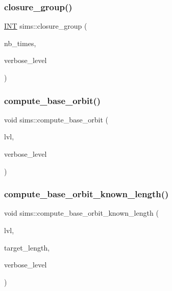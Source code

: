 \mbox{\label{classsims_a7ecab5d843b1960ba9386e1b5dd41b95}} 
\subsubsection{\texorpdfstring{closure\+\_\+group()}{closure\_group()}}
{\footnotesize\ttfamily \mbox{\hyperlink{galois_8h_a09fddde158a3a20bd2dcadb609de11dc}{I\+NT}} sims\+::closure\+\_\+group (\begin{DoxyParamCaption}\item[{\mbox{\hyperlink{galois_8h_a09fddde158a3a20bd2dcadb609de11dc}{I\+NT}}}]{nb\+\_\+times,  }\item[{\mbox{\hyperlink{galois_8h_a09fddde158a3a20bd2dcadb609de11dc}{I\+NT}}}]{verbose\+\_\+level }\end{DoxyParamCaption})}

\mbox{\label{classsims_aabf4d450355421818e97e614bbfe2e91}} 
\subsubsection{\texorpdfstring{compute\+\_\+base\+\_\+orbit()}{compute\_base\_orbit()}}
{\footnotesize\ttfamily void sims\+::compute\+\_\+base\+\_\+orbit (\begin{DoxyParamCaption}\item[{\mbox{\hyperlink{galois_8h_a09fddde158a3a20bd2dcadb609de11dc}{I\+NT}}}]{lvl,  }\item[{\mbox{\hyperlink{galois_8h_a09fddde158a3a20bd2dcadb609de11dc}{I\+NT}}}]{verbose\+\_\+level }\end{DoxyParamCaption})}

\mbox{\label{classsims_af93aba6d77ea121ff5e1dec9fefa0002}} 
\subsubsection{\texorpdfstring{compute\+\_\+base\+\_\+orbit\+\_\+known\+\_\+length()}{compute\_base\_orbit\_known\_length()}}
{\footnotesize\ttfamily void sims\+::compute\+\_\+base\+\_\+orbit\+\_\+known\+\_\+length (\begin{DoxyParamCaption}\item[{\mbox{\hyperlink{galois_8h_a09fddde158a3a20bd2dcadb609de11dc}{I\+NT}}}]{lvl,  }\item[{\mbox{\hyperlink{galois_8h_a09fddde158a3a20bd2dcadb609de11dc}{I\+NT}}}]{target\+\_\+length,  }\item[{\mbox{\hyperlink{galois_8h_a09fddde158a3a20bd2dcadb609de11dc}{I\+NT}}}]{verbose\+\_\+level }\end{DoxyParamCaption})}

